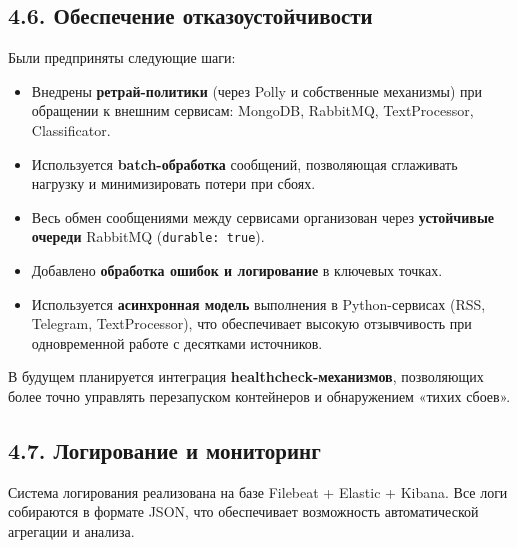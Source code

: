 \hypertarget{ux43eux431ux435ux441ux43fux435ux447ux435ux43dux438ux435-ux43eux442ux43aux430ux437ux43eux443ux441ux442ux43eux439ux447ux438ux432ux43eux441ux442ux438}{%
\subsection{4.6. Обеспечение
отказоустойчивости}\label{ux43eux431ux435ux441ux43fux435ux447ux435ux43dux438ux435-ux43eux442ux43aux430ux437ux43eux443ux441ux442ux43eux439ux447ux438ux432ux43eux441ux442ux438}}

Были предприняты следующие шаги:

\begin{itemize}
\tightlist
\item
  Внедрены \textbf{ретрай-политики} (через Polly и собственные
  механизмы) при обращении к внешним сервисам: MongoDB, RabbitMQ,
  TextProcessor, Classificator.\\
\item
  Используется \textbf{batch-обработка} сообщений, позволяющая
  сглаживать нагрузку и минимизировать потери при сбоях.\\
\item
  Весь обмен сообщениями между сервисами организован через
  \textbf{устойчивые очереди} RabbitMQ (\texttt{durable:\ true}).\\
\item
  Добавлено \textbf{обработка ошибок и логирование} в ключевых точках.\\
\item
  Используется \textbf{асинхронная модель} выполнения в Python-сервисах
  (RSS, Telegram, TextProcessor), что обеспечивает высокую отзывчивость
  при одновременной работе с десятками источников.
\end{itemize}

В будущем планируется интеграция \textbf{healthcheck-механизмов},
позволяющих более точно управлять перезапуском контейнеров и
обнаружением «тихих сбоев».

\hypertarget{ux43bux43eux433ux438ux440ux43eux432ux430ux43dux438ux435-ux438-ux43cux43eux43dux438ux442ux43eux440ux438ux43dux433}{%
\subsection{4.7. Логирование и
мониторинг}\label{ux43bux43eux433ux438ux440ux43eux432ux430ux43dux438ux435-ux438-ux43cux43eux43dux438ux442ux43eux440ux438ux43dux433}}

Система логирования реализована на базе Filebeat + Elastic + Kibana. Все
логи собираются в формате JSON, что обеспечивает возможность
автоматической агрегации и анализа.

